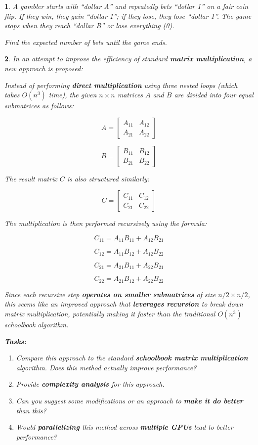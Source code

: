 \documentclass[%
addpoints]{exam}
\theoremstyle{problem}
\newtheorem{p}{}
\begin{document}
\begin{p}
A gambler starts with ``dollar A'' and repeatedly bets ``dollar 1'' on a fair coin flip. If they win, they gain ``dollar 1''; if they lose, they lose ``dollar 1''. The game stops when they reach ``dollar B'' or lose everything (0). 

Find the expected number of bets until the game ends.
\hfill\end{p}

\begin{p}
In an attempt to improve the efficiency of standard \textbf{matrix multiplication}, a new approach is proposed:

Instead of performing \textbf{direct multiplication} using three nested loops (which takes $O(n^3)$ time), the given $n \times n$ matrices $A$ and $B$ are divided into four equal submatrices as follows:

\[
A =
\begin{bmatrix}
A_{11} & A_{12} \\
A_{21} & A_{22}
\end{bmatrix}
\]

\[
B =
\begin{bmatrix}
B_{11} & B_{12} \\
B_{21} & B_{22}
\end{bmatrix}
\]

The result matrix $C$ is also structured similarly:

\[
C =
\begin{bmatrix}
C_{11} & C_{12} \\
C_{21} & C_{22}
\end{bmatrix}
\]

The multiplication is then performed recursively using the formula:

\[
C_{11} = A_{11} B_{11} + A_{12} B_{21}
\]

\[
C_{12} = A_{11} B_{12} + A_{12} B_{22}
\]

\[
C_{21} = A_{21} B_{11} + A_{22} B_{21}
\]

\[
C_{22} = A_{21} B_{12} + A_{22} B_{22}
\]

Since each recursive step \textbf{operates on smaller submatrices} of size $n/2 \times n/2$, this seems like an improved approach that \textbf{leverages recursion} to break down matrix multiplication, potentially making it faster than the traditional $O(n^3)$ schoolbook algorithm.

\textbf{Tasks:}

\begin{enumerate}
    \item Compare this approach to the standard \textbf{schoolbook matrix multiplication} algorithm. Does this method actually improve performance?
    \item Provide \textbf{complexity analysis} for this approach.
    \item Can you suggest some modifications or an approach to \textbf{make it do better} than this?
    \item Would \textbf{parallelizing} this method across \textbf{multiple GPUs} lead to better performance?
\end{enumerate}
\hfill\end{p}
\end{document}
